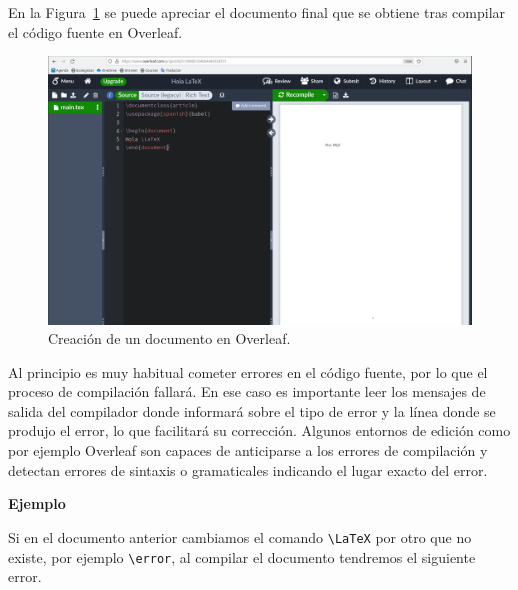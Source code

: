 \documentclass[
  a4paper,
]{scrreport}
\begin{document}
En la Figura~\ref{fig-overleaf-hola-latex} se puede apreciar el
documento final que se obtiene tras compilar el código fuente en
Overleaf.

\begin{figure}

{\centering \includegraphics{./img/introduccion/overleaf-hola-latex.png}

}

\caption{\label{fig-overleaf-hola-latex}Creación de un documento en
Overleaf.}

\end{figure}

Al principio es muy habitual cometer errores en el código fuente, por lo
que el proceso de compilación fallará. En ese caso es importante leer
los mensajes de salida del compilador donde informará sobre el tipo de
error y la línea donde se produjo el error, lo que facilitará su
corrección. Algunos entornos de edición como por ejemplo Overleaf son
capaces de anticiparse a los errores de compilación y detectan errores
de sintaxis o gramaticales indicando el lugar exacto del error.

\textbf{Ejemplo}

Si en el documento anterior cambiamos el comando
\texttt{\textbackslash{}LaTeX} por otro que no existe, por ejemplo
\texttt{\textbackslash{}error}, al compilar el documento tendremos el
siguiente error.
\end{document}
